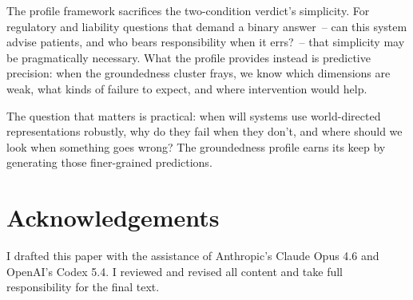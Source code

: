 \documentclass[12pt]{article}
\begin{document}
The profile framework sacrifices the two-condition verdict's simplicity. For regulatory and liability questions that demand a binary answer~-- can this system advise patients, and who bears responsibility when it errs?~-- that simplicity may be pragmatically necessary. What the profile provides instead is predictive precision: when the groundedness cluster frays, we know which dimensions are weak, what kinds of failure to expect, and where intervention would help.

The question that matters is practical: when will systems use world-directed representations robustly, why do they fail when they don't, and where should we look when something goes wrong? The groundedness profile earns its keep by generating those finer-grained predictions.

\section*{Acknowledgements}

I drafted this paper with the assistance of Anthropic's Claude Opus 4.6 and OpenAI's Codex 5.4. I reviewed and revised all content and take full responsibility for the final text.

\newpage
\printbibliography
\end{document}

